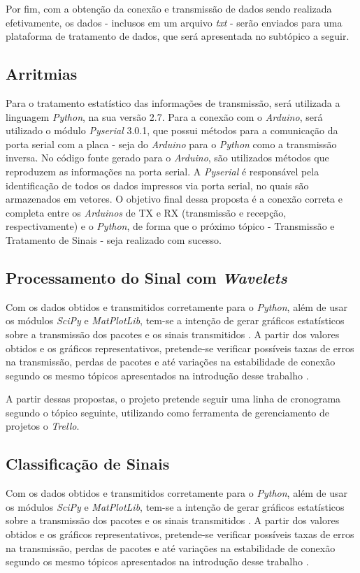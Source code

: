 \documentclass[conference]{IEEEtran}
\begin{document}
Por fim, com a obten\c{c}\~ao da conex\~ao e transmiss\~ao de dados sendo realizada efetivamente, os dados - inclusos em um arquivo \textit{txt} - ser\~ao enviados para uma plataforma de tratamento de dados, que ser\'a apresentada no subt\'opico a seguir.

\subsection{Arritmias}

Para o tratamento estat\'istico das informa\c{c}\~oes de transmiss\~ao, ser\'a utilizada a linguagem \textit{Python}, na sua vers\~ao 2.7. Para a conex\~ao com o \textit{Arduino}, ser\'a utilizado o m\'odulo \textit{Pyserial} 3.0.1, que possui m\'etodos para a comunica\c{c}\~ao da porta serial com a placa - seja do \textit{Arduino} para o \textit{Python} como a transmiss\~ao inversa. No c\'odigo fonte gerado para o \textit{Arduino}, s\~ao utilizados m\'etodos que reproduzem as informa\c{c}\~oes na porta serial. A \textit{Pyserial} \'e respons\'avel pela identifica\c{c}\~ao de todos os dados impressos via porta serial, no quais s\~ao armazenados em vetores. O objetivo final dessa proposta \'e a conex\~ao correta e completa entre os \textit{Arduinos} de TX e RX (transmiss\~ao e recep\c{c}\~ao, respectivamente) e o \textit{Python}, de forma que o pr\'oximo t\'opico - Transmiss\~ao e Tratamento de Sinais - seja realizado com sucesso.

\subsection{Processamento do Sinal com \textit{Wavelets}}
Com os dados obtidos e transmitidos corretamente para o \textit{Python}, al\'em de usar os m\'odulos \textit{SciPy} e \textit{MatPlotLib}, tem-se a inten\c{c}\~ao de gerar gr\'aficos estat\'isticos sobre a transmiss\~ao dos pacotes e os sinais transmitidos \cite{pythonPSV}. A partir dos valores obtidos e os gr\'aficos representativos, pretende-se verificar poss\'iveis taxas de erros na transmiss\~ao, perdas de pacotes e at\'e varia\c{c}\~oes na estabilidade de conex\~ao segundo os mesmo t\'opicos apresentados na introdu\c{c}\~ao desse trabalho \cite{ciscoRfProblems}.

A partir dessas propostas, o projeto pretende seguir uma linha de cronograma segundo o t\'opico seguinte, utilizando como ferramenta de gerenciamento de projetos o \textit{Trello}.

\subsection{Classificação de Sinais}
Com os dados obtidos e transmitidos corretamente para o \textit{Python}, al\'em de usar os m\'odulos \textit{SciPy} e \textit{MatPlotLib}, tem-se a inten\c{c}\~ao de gerar gr\'aficos estat\'isticos sobre a transmiss\~ao dos pacotes e os sinais transmitidos \cite{pythonPSV}. A partir dos valores obtidos e os gr\'aficos representativos, pretende-se verificar poss\'iveis taxas de erros na transmiss\~ao, perdas de pacotes e at\'e varia\c{c}\~oes na estabilidade de conex\~ao segundo os mesmo t\'opicos apresentados na introdu\c{c}\~ao desse trabalho \cite{ciscoRfProblems}.
\end{document}
